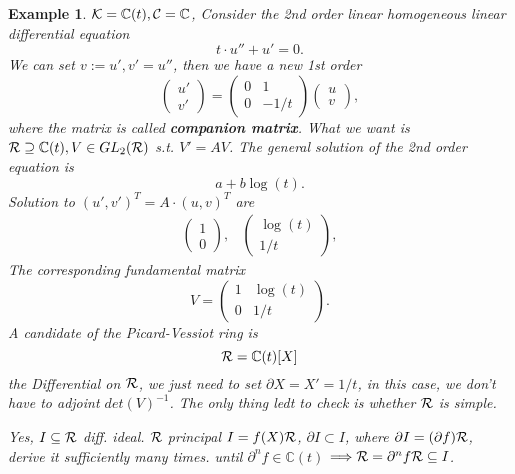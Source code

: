 \documentclass[11pt]{article}
\newtheorem{ex}[thm]{Example}
\newcommand{\pd}{\partial}
\newcommand{\cplx}{\mathbb C}
\newcommand{\calc}{{\cal C}}
\newcommand{\calk}{{\cal K}}
\newcommand{\calr}{{\cal R}}
\newcommand{\Lrta}{\Longrightarrow}
\begin{document}
\begin{ex}
$\calk=\cplx(t), \calc=\cplx$, Consider the 2nd order linear homogeneous linear differential equation
$$
t\cdot u''+u'=0.
$$
We can set $v:=u', v'=u''$, then we have a new 1st order 
$$
\begin{pmatrix}
u'\\
v'
\end{pmatrix} =\begin{pmatrix}
0 & 1\\
0 & -1/t
\end{pmatrix}\begin{pmatrix}
u\\
v
\end{pmatrix},
$$
where the matrix is called \textbf{companion matrix}.
What we want is $\calr\supseteq \cplx(t), V\in GL_2(\calr)$ s.t. $V'=AV$. The general solution of the 2nd order equation is 
$$
a+b \log(t).
$$
Solution to $(u',v')^T=A\cdot(u,v)^T$ are
$$
\begin{aligned}
\begin{pmatrix}
1\\
0
\end{pmatrix},
&
\begin{pmatrix}
\log(t)\\
1/t
\end{pmatrix},
\end{aligned}
$$
The corresponding fundamental matrix 
$$
V=\begin{pmatrix}
1 & \log(t)\\
0 & 1/t
\end{pmatrix}.
$$
A candidate of the Picard-Vessiot ring is 
$$
\calr=\cplx(t)[X]
$$
the Differential on $\calr$, we just need to set $\pd X=X'=1/t$, in this case, we don't have to adjoint $det(V)^{-1}$. The only thing ledt to check is whether $\calr$ is simple.

Yes, $I\subseteq \calr$ diff. ideal. $\calr$ principal $I=f(X)\calr$,  $\pd I\subset I$, where $\pd I=(\pd f)\calr$, derive it sufficiently many times. until $\pd^n f\in \cplx(t)$ $\Lrta \calr=\pd^n f\calr \subseteq I$.  
\end{ex}
\end{document}
